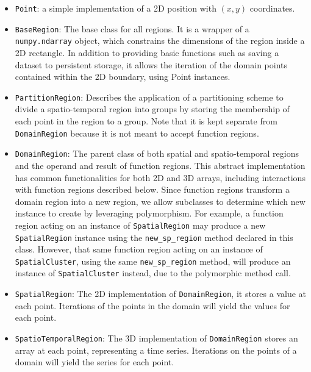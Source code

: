 \begin{itemize}
	\item \texttt{Point}: a simple implementation of a 2D position with $(x, y)$ coordinates.
	
	\item \texttt{BaseRegion}: The base class for all regions. It is a wrapper of a \texttt{numpy.ndarray} object, which constrains the dimensions of the region inside a 2D rectangle. In addition to providing basic functions such as saving a dataset to persistent storage, it allows the iteration of the domain points contained within the 2D boundary, using Point instances.
	
	\item \texttt{PartitionRegion}: Describes the application of a partitioning scheme to divide a spatio-temporal region into groups by storing the membership of each point in the region to a group. Note that it is kept separate from \texttt{DomainRegion} because it is not meant to accept function regions.
	
	\item \texttt{DomainRegion}: The parent class of both spatial and spatio-temporal regions and the operand and result of function regions. This abstract implementation has common functionalities for both 2D and 3D arrays, including interactions with function regions described below. Since function regions transform a domain region into a new region, we allow subclasses to determine which new instance to create by leveraging polymorphism. For example, a function region acting on an instance of \texttt{SpatialRegion} may produce a new \texttt{SpatialRegion} instance using the \texttt{new\_sp\_region} method declared in this class. However, that same function region acting on an instance of \texttt{SpatialCluster}, using the same \texttt{new\_sp\_region} method, will produce an instance of \texttt{SpatialCluster} instead, due to the polymorphic method call.
	
	\item \texttt{SpatialRegion}: The 2D implementation of \texttt{DomainRegion}, it stores a value at each point. Iterations of the points in the domain will yield the values for each point.
	
	\item \texttt{SpatioTemporalRegion}: The 3D implementation of \texttt{DomainRegion} stores an array at each point, representing a time series. Iterations on the points of a domain will yield the series for each point.
	

\end{itemize}
